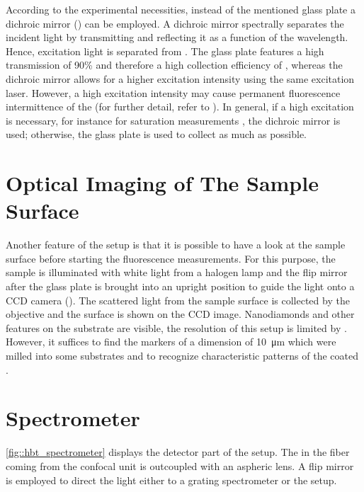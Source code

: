 		According to the experimental necessities, instead of the mentioned glass plate a dichroic mirror () can be employed.
		A dichroic mirror spectrally separates the incident light by transmitting and reflecting it as a function of the wavelength. 
		Hence, excitation light is separated from \fl.
		The glass plate features a high transmission of 90\% and therefore a high collection efficiency of \fl, whereas the dichroic mirror allows for a higher excitation intensity using the same excitation laser. 
		However, a high excitation intensity may cause permanent fluorescence intermittence of the \sivs (for further detail, refer to ).
		In general, if a high excitation is necessary, for instance for saturation measurements , the dichroic mirror is used; otherwise, the glass plate is used to collect as much \fl as possible.

	\section[Sample Surface]{Optical Imaging of The Sample Surface}

		Another feature of the setup is that it is possible to have a look at the sample surface before starting the fluorescence measurements.
		For this purpose, the sample is illuminated with white light from a halogen lamp and the flip mirror after the glass plate is brought into an upright position to guide the light onto a CCD camera ().
		The scattered light from the sample surface is collected by the objective and the surface is shown on the CCD image.
		Nanodiamonds and other features on the substrate are visible, the resolution of this setup is limited by .
		However, it suffices to find the markers of a dimension of \SI{10}{\micro\meter} which were milled into some substrates and to recognize characteristic patterns of the coated \nds.

	\section[Spectrometer]{Spectrometer}

		\autoref{fig::hbt_spectrometer} displays the detector part of the setup.
		The \fl in the fiber coming from the confocal unit is outcoupled with an aspheric lens. 
		A flip mirror is employed to direct the light either to a grating spectrometer or the \hbt setup.


